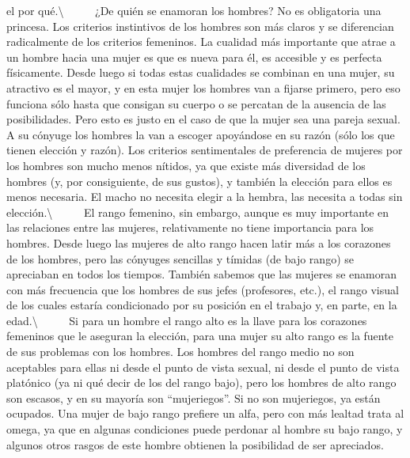 el por qué.\textbackslash{} ~ ~ ~ ¿De quién se enamoran los hombres? No
es obligatoria una princesa. Los criterios instintivos de los hombres
son más claros y se diferencian radicalmente de los criterios femeninos.
La cualidad más importante que atrae a un hombre hacia una mujer es que
es nueva para él, es accesible y es perfecta físicamente. Desde luego si
todas estas cualidades se combinan en una mujer, su atractivo es el
mayor, y en esta mujer los hombres van a fijarse primero, pero eso
funciona sólo hasta que consigan su cuerpo o se percatan de la ausencia
de las posibilidades. Pero esto es justo en el caso de que la mujer sea
una pareja sexual. A su cónyuge los hombres la van a escoger apoyándose
en su razón (sólo los que tienen elección y razón). Los criterios
sentimentales de preferencia de mujeres por los hombres son mucho menos
nítidos, ya que existe más diversidad de los hombres (y, por
consiguiente, de sus gustos), y también la elección para ellos es menos
necesaria. El macho no necesita elegir a la hembra, las necesita a todas
sin elección.\textbackslash{} ~ ~ ~ El rango femenino, sin embargo,
aunque es muy importante en las relaciones entre las mujeres,
relativamente no tiene importancia para los hombres. Desde luego las
mujeres de alto rango hacen latir más a los corazones de los hombres,
pero las cónyuges sencillas y tímidas (de bajo rango) se apreciaban en
todos los tiempos. También sabemos que las mujeres se enamoran con más
frecuencia que los hombres de sus jefes (profesores, etc.), el rango
visual de los cuales estaría condicionado por su posición en el trabajo
y, en parte, en la edad.\textbackslash{} ~ ~ ~ Si para un hombre el
rango alto es la llave para los corazones femeninos que le aseguran la
elección, para una mujer su alto rango es la fuente de sus problemas con
los hombres. Los hombres del rango medio no son aceptables para ellas ni
desde el punto de vista sexual, ni desde el punto de vista platónico (ya
ni qué decir de los del rango bajo), pero los hombres de alto rango son
escasos, y en su mayoría son ``mujeriegos''. Si no son mujeriegos, ya
están ocupados. Una mujer de bajo rango prefiere un alfa, pero con más
lealtad trata al omega, ya que en algunas condiciones puede perdonar al
hombre su bajo rango, y algunos otros rasgos de este hombre obtienen la
posibilidad de ser apreciados.

